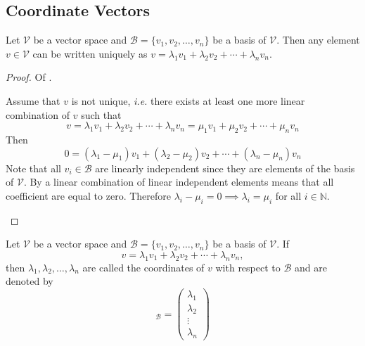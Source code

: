 \subsection{Coordinate Vectors}\label{subsec-coordinate-vectors}

\begin{thm}\label{thm-basis-unique-linear-combination}
	Let $\mathcal{V}$ be a vector space and $\mathcal{B}=\{v_1,v_2,\dots,v_n\}$
	be a basis of $\mathcal{V}$. Then any element $v\in\mathcal{V}$ can be written
	uniquely as $v=\lambda_1v_1+\lambda_2v_2+\cdots+\lambda_nv_n$.
\end{thm}

\begin{proof}
	Of .
	\begin{flushleft}
		Assume that $v$ is not unique, \textit{i.e.} there exists at
		least one more linear combination of $v$ such that
		\begin{equation*}
			v=\lambda_1v_1+\lambda_2v_2+\cdots+\lambda_nv_n=\mu_1v_1+\mu_2v_2+\cdots+\mu_nv_n
		\end{equation*}
		Then
		\begin{equation*}
			0=(\lambda_1-\mu_1)v_1+(\lambda_2-\mu_2)v_2+\cdots+(\lambda_n-\mu_n)v_n
		\end{equation*}
		Note that all $v_i\in\mathcal{B}$ are linearly independent since they are
		elements of the basis of $\mathcal{V}$. By 
		a linear combination of linear independent elements means that all coefficient
		are equal to zero. Therefore $\lambda_i-\mu_i=0\implies\lambda_i=\mu_i$
		for all $i\in\mathbb{N}$.
	\end{flushleft}
\end{proof}

\begin{definition}\label{def-coordinate-vector}
	Let $\mathcal{V}$ be a vector space and $\mathcal{B}=\{v_1,v_2,\dots,v_n\}$
	be a basis of $\mathcal{V}$. If
	\begin{equation*}
		v=\lambda_1v_1+\lambda_2v_2+\cdots+\lambda_nv_n,
	\end{equation*}
	then $\lambda_1,\lambda_2,\dots,\lambda_n$ are called the coordinates of
	$v$ with respect to $\mathcal{B}$ and are denoted by
	\begin{equation}
		[v]_\mathcal{B}=\begin{pmatrix}
			\lambda_1 \\
			\lambda_2 \\
			\vdots    \\
			\lambda_n
		\end{pmatrix}
	\end{equation}
\end{definition}

